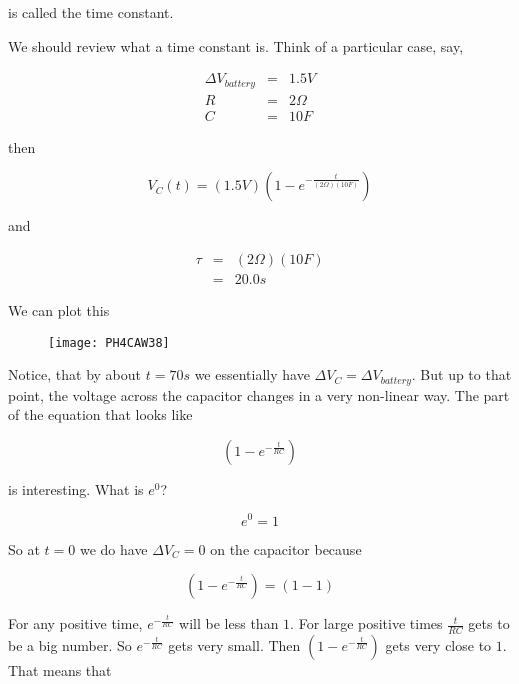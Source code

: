 \noindent is called the time constant.

We should review what a time constant is. Think of a particular case, say, 

\begin{eqnarray*}
	\Delta V_{battery} &=&1.5\unit{V} \\R &=&2\unit{\Omega} \\C &=&10\unit{F}
\end{eqnarray*}

\noindent then

\begin{equation*}
	V_{C}(t)=\left( 1.5\unit{V}\right) \left( 1-e^{-\frac{t}{\left( 2\unit{\Omega}\right) \left( 10\unit{F}\right) }}\right)
\end{equation*}

\noindent and 

\begin{eqnarray*}
	\tau &=&\left( 2\unit{\Omega}\right) \left( 10\unit{F}\right) \\
	     &=&\allowbreak 20.0\unit{s}
\end{eqnarray*}

We can plot this
\begin{figure}[h!]
	\centering
	\texttt{[image: PH4CAW38]}
\end{figure}

Notice, that by about $t=70\unit{s}$ we essentially have $\Delta V_{C}=\Delta V_{battery}.$ But up to that point, the voltage across the capacitor changes in a very non-linear way. The part of the equation that looks like

\begin{equation*}
	\left( 1-e^{-\frac{t}{RC}}\right)
\end{equation*}

\noindent is interesting. What is $e^{0}$?

\begin{equation*}
	e^{0}=1
\end{equation*}

So at $t=0$ we do have $\Delta V_{C}=0$ on the capacitor because 

\begin{equation*}
	\left( 1-e^{-\frac{t}{RC}}\right) =\left( 1-1\right)
\end{equation*}

For any positive time, $e^{-\frac{t}{RC}}$ will be less than $1.$ For large positive times $\frac{t}{RC}$ gets to be a big number. So $e^{-\frac{t}{RC}}$ gets very small. Then  $\left(1-e^{-\frac{t}{RC}}\right) $ gets very close to $1.$ That means that 

